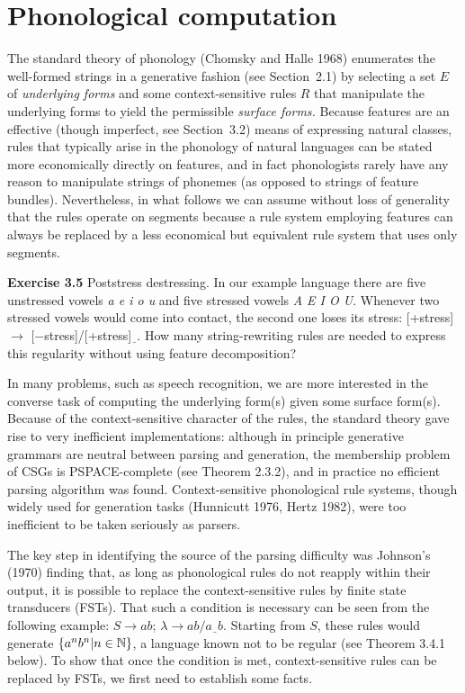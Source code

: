 \section{Phonological computation}

The standard theory of phonology (Chomsky and Halle 1968)
\nocite{Chomsky:1968} enumerates the well-formed strings in a generative
fashion (see Section~2.1) by selecting a set $E$ of {\it underlying forms} and
some context-sensitive rules $R$ that manipulate the underlying forms to yield
the permissible {\it surface forms.} 
Because features are an effective (though imperfect, see Section~3.2)
means of expressing natural classes, rules that typically arise in the
phonology of natural languages can be stated more economically directly on
features, and in fact phonologists rarely have any reason to manipulate
strings of phonemes (as opposed to strings of feature bundles). Nevertheless,
in what follows we can assume without loss of generality that the rules
operate on segments because a rule system employing features can always be
replaced by a less economical but equivalent rule system that uses only
segments.

\smallskip\noindent
{\bf Exercise 3.5} Poststress destressing. In our example language there
are five unstressed vowels {\it a e i o u} and five stressed vowels {\it A E I
O U}. Whenever two stressed vowels would come into contact, the second one
loses its stress: [+stress] $\rightarrow$ [$-$stress]/[+stress]$\underline{\ \
}$. How many string-rewriting rules are needed to express this regularity
without using feature decomposition? 

\medskip\noindent In many problems, such as speech recognition, we are more
interested in the converse task of computing the underlying form(s) given some
surface form(s). Because of the context-sensitive character of the rules, the
standard theory gave rise to very inefficient implementations: although in
principle generative grammars are neutral between parsing and generation, the
membership problem of CSGs is PSPACE-complete (see Theorem 2.3.2), and in
practice no efficient parsing algorithm was found. Context-sensitive
phonological rule systems, though widely used for generation tasks (Hunnicutt
1976, Hertz 1982),\nocite{Hunnicutt:1976,Hertz:1982} were too inefficient to
be taken seriously as parsers.\index{text to speech, TTS}

The key step in identifying the source of the parsing difficulty was Johnson's
(1970) \nocite{Johnson:1970} finding that, as long as phonological rules do
not reapply within their output, it is possible to replace the
context-sensitive rules by finite state transducers (FSTs).
 That such a condition is necessary can be seen from
the following example: $S\rightarrow ab$; $\lambda \rightarrow ab /
a\underline{\ \ }b$.  Starting from $S$, these rules would generate $\{a^nb^n|
n \in \Bbb N\}$, a language known not to be regular (see Theorem 3.4.1
below). \index{$a^nb^n$} To show that once the condition is met,
context-sensitive rules can be replaced by FSTs, we first need to establish
some facts.

